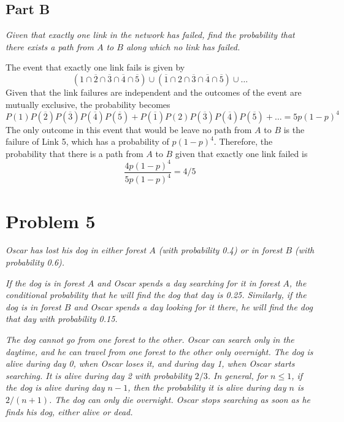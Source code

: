 \documentclass{article}
\begin{document}
\subsection*{Part B}

\textit{Given that exactly one link in the network has failed, find the
probability that there exists a path from $ A $ to $ B $ along which no link has
failed.}

\bigbreak

The event that exactly one link fails is given by
$$ (1 \cap \overline{2} \cap \overline{3} \cap \overline{4} \cap \overline{5})
\cup (\overline{1} \cap 2 \cap \overline{3} \cap \overline{4} \cap \overline{5})
\cup \ldots $$
Given that the link failures are independent and the outcomes of the event are
mutually exclusive, the probability becomes
$$ P(1)P(\overline{2})P(\overline{3})P(\overline{4})P(\overline{5}) +
P(\overline{1})P(2)P(\overline{3})P(\overline{4})P(\overline{5}) + \ldots = 5
p(1 - p)^4 $$
The only outcome in this event that would be leave no path from $ A $ to $ B $
is the failure of Link 5, which has a probability of $ p(1 - p)^4 $. Therefore,
the probability that there is a path from $ A $ to $ B $ given that exactly one
link failed is
$$ \frac{ 4 p (1 - p)^4 }{ 5 p (1 - p)^4 } = 4/5 $$

\section*{Problem 5}

\textit{Oscar has lost his dog in either forest $ A $ (with probability 0.4) or
in forest $ B $ (with probability 0.6).}

\textit{If the dog is in forest $ A $ and Oscar spends a day searching for it in
forest $ A $, the conditional probability that he will find the dog that day is
0.25.  Similarly, if the dog is in forest $ B $ and Oscar spends a day looking
for it there, he will find the dog that day with probability 0.15.}

\textit{The dog cannot go from one forest to the other. Oscar can search only in
the daytime, and he can travel from one forest to the other only overnight. The
dog is alive during day 0, when Oscar loses it, and during day 1, when Oscar
starts searching. It is alive during day 2 with probability $ 2/3 $. In general,
for $ n \leq 1 $, if the dog is alive during day $ n - 1 $, then the probability
it is alive during day $ n $ is $ 2/(n + 1) $. The dog can only die overnight.
Oscar stops searching as soon as he finds his dog, either alive or dead.}
\end{document}
